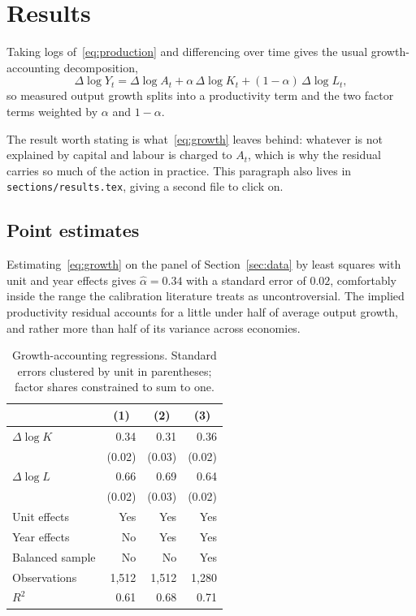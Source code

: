\section{Results}

Taking logs of~\eqref{eq:production} and differencing over time gives the usual
growth-accounting decomposition,
\begin{equation}
  \Delta \log Y_{t} = \Delta \log A_{t} + \alpha \, \Delta \log K_{t}
    + (1 - \alpha) \, \Delta \log L_{t},
  \label{eq:growth}
\end{equation}
so measured output growth splits into a productivity term and the two factor
terms weighted by $\alpha$ and $1 - \alpha$.

The result worth stating is what~\eqref{eq:growth} leaves behind: whatever is not
explained by capital and labour is charged to $A_{t}$, which is why the residual
carries so much of the action in practice. This paragraph also lives in
\texttt{sections/results.tex}, giving a second file to click on.

\subsection{Point estimates}

Estimating~\eqref{eq:growth} on the panel of Section~\ref{sec:data} by
least squares with unit and year effects gives $\hat{\alpha} = 0.34$ with a
standard error of $0.02$, comfortably inside the range the calibration
literature treats as uncontroversial. The implied productivity residual accounts
for a little under half of average output growth, and rather more than half of
its variance across economies.

\begin{table}[ht]
  \centering
  \begin{tabular}{lrrr}
    \hline
    & \multicolumn{1}{c}{(1)} & \multicolumn{1}{c}{(2)} & \multicolumn{1}{c}{(3)} \\
    \hline
    $\Delta \log K$  & 0.34 & 0.31 & 0.36 \\
                     & (0.02) & (0.03) & (0.02) \\
    $\Delta \log L$  & 0.66 & 0.69 & 0.64 \\
                     & (0.02) & (0.03) & (0.02) \\
    Unit effects     & Yes & Yes & Yes \\
    Year effects     & No  & Yes & Yes \\
    Balanced sample  & No  & No  & Yes \\
    \hline
    Observations     & 1{,}512 & 1{,}512 & 1{,}280 \\
    $R^{2}$          & 0.61 & 0.68 & 0.71 \\
    \hline
  \end{tabular}
  \caption{Growth-accounting regressions. Standard errors clustered by unit in
    parentheses; factor shares constrained to sum to one.}
  \label{tab:estimates}
\end{table}

